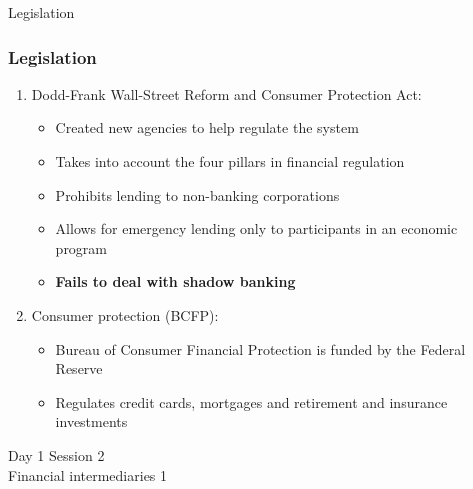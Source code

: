 \documentclass[11pt]{beamer}
\newcommand{\mcdr}[1]{{{\bf \color{red4}#1}}}
\begin{document}
\begin{frame}{Legislation}
\frametitle{Legislation}
\begin{enumerate}
\item Dodd-Frank Wall-Street Reform and Consumer Protection Act:

\begin{itemize}
\item Created new agencies to help regulate the system
\item Takes into account the four pillars in financial regulation
\item Prohibits lending to non-banking corporations
\item Allows for emergency lending only to participants in an economic program
\item \mcdr{Fails to deal with shadow banking}
\end{itemize}
\vspace{3mm}

\item Consumer protection (BCFP):
\begin{itemize}
\item Bureau of Consumer Financial Protection is funded by the Federal Reserve
\item Regulates credit cards, mortgages and retirement and insurance investments
\end{itemize}
\end{enumerate}
\end{frame}












%

\begin{frame}
\begin{center}
 Day 1 Session 2 \\
 Financial intermediaries 1
\end{center}
\end{frame}

\end{document}
